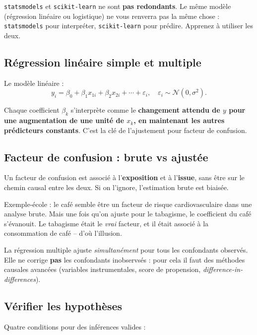 \documentclass[11pt,a4paper]{article}
\begin{document}
\begin{notebox}
\texttt{statsmodels} et \texttt{scikit-learn} ne sont \textbf{pas
redondants}. Le m\^eme mod\`ele (r\'egression lin\'eaire ou logistique) ne
vous renverra pas la m\^eme chose : \texttt{statsmodels} pour
interpr\'eter, \texttt{scikit-learn} pour pr\'edire. Apprenez \`a
utiliser les deux.
\end{notebox}

\subsection{R\'egression lin\'eaire simple et multiple}

Le mod\`ele lin\'eaire :
\[
y_i = \beta_0 + \beta_1 x_{1i} + \beta_2 x_{2i} + \cdots + \varepsilon_i,
\quad
\varepsilon_i \sim \mathcal{N}(0, \sigma^2).
\]

Chaque coefficient $\beta_k$ s'interpr\`ete comme le \textbf{changement
attendu de $y$ pour une augmentation de une unit\'e de $x_k$, en
maintenant les autres pr\'edicteurs constants}. C'est la cl\'e de
l'ajustement pour facteur de confusion.

\subsection{Facteur de confusion : brute vs ajust\'ee}

Un facteur de confusion est associ\'e \`a l'\textbf{exposition} et \`a
l'\textbf{issue}, sans \^etre sur le chemin causal entre les deux. Si on
l'ignore, l'estimation brute est biais\'ee.

Exemple-\'ecole : le caf\'e semble \^etre un facteur de risque
cardiovasculaire dans une analyse brute. Mais une fois qu'on ajuste pour
le tabagisme, le coefficient du caf\'e s'\'evanouit. Le tabagisme \'etait
le \emph{vrai} facteur, et il \'etait associ\'e \`a la consommation de
caf\'e -- d'o\`u l'illusion.

La r\'egression multiple ajuste \emph{simultan\'ement} pour tous les
confondants observ\'es. Elle ne corrige \textbf{pas} les confondants
inobservs\'es : pour cela il faut des m\'ethodes causales avanc\'ees
(variables instrumentales, score de propension, \emph{difference-in-
differences}).

\subsection{V\'erifier les hypoth\`eses}

Quatre conditions pour des inf\'erences valides :
\end{document}
